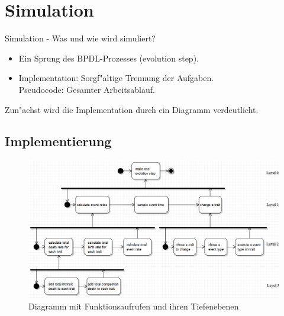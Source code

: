 \documentclass{beamer}
\begin{document}
\section{Simulation}
\begin{frame}{Simulation - Was und wie wird simuliert?}
	\begin{itemize}\pause
		\item Ein Sprung des BPDL-Prozesses (evolution step).\pause
		\item Implementation: Sorgf"altige Trennung der Aufgaben.\\
			Pseudocode: Gesamter Arbeitsablauf.\pause
	\end{itemize}
	Zun"achst wird die Implementation durch ein Diagramm verdeutlicht.
\end{frame}

\subsection{Implementierung}
\begin{frame}
	\begin{figure}[H]
		\centering
		\includegraphics[width=1\linewidth]{../UMLs/PseudoCodeForBThesis}
		\caption{Diagramm mit Funktionsaufrufen und ihren Tiefenebenen}
	\end{figure}
\end{frame}
\end{document}
